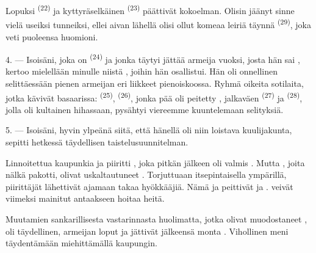Lopuksi  \textsuperscript{(22)} ja kyttyräselkäinen
 \textsuperscript{(23)} päättivät kokoelman. Olisin jäänyt
sinne vielä useiksi tunneiksi, ellei aivan lähellä olisi ollut komeaa leiriä
täynnä  \textsuperscript{(29)}, joka veti puoleensa
huomioni.

\VUsaut{4.0mm}
\VUsaut{2.8mm}

4. --- Isoisäni, joka on  \textsuperscript{(24)} ja jonka täytyi
jättää armeija  vuoksi, josta hän sai ,
kertoo mielellään minulle niistä , joihin hän osallistui.
Hän oli onnellinen selittäessään pienen armeijan eri liikkeet pienoiskoossa.
Ryhmä oikeita sotilaita, jotka kävivät basaarissa: 
\textsuperscript{(25)},  \textsuperscript{(26)}, jonka pää
oli peitetty , jalkaväen 
\textsuperscript{(27)} ja  \textsuperscript{(28)},
jolla oli kultainen  hihassaan, pysähtyi viereemme kuuntelemaan
selityksiä.

5. --- Isoisäni, hyvin ylpeänä siitä, että hänellä oli niin loistava
kuulijakunta, sepitti hetkessä täydellisen taistelusuunnitelman.

Linnoitettua kaupunkia  ja  piiritti
, joka pitkän  jälkeen oli valmis
. Mutta , joita nälkä pakotti, olivat
uskaltautuneet  
. Torjuttuaan  itsepintaisella
  ympärillä, 
piirittäjät lähettivät  ajamaan takaa
 hyökkääjiä. Nämä  ja peittivät
  ja .
 veivät viimeksi mainitut 
antaakseen  hoitaa heitä.

Muutamien  sankarillisesta vastarinnasta huolimatta, jotka
olivat muodostaneet ,  oli täydellinen, armeijan
loput  ja jättivät jälkeensä monta .
Vihollinen meni täydentämään  miehittämällä kaupungin.


